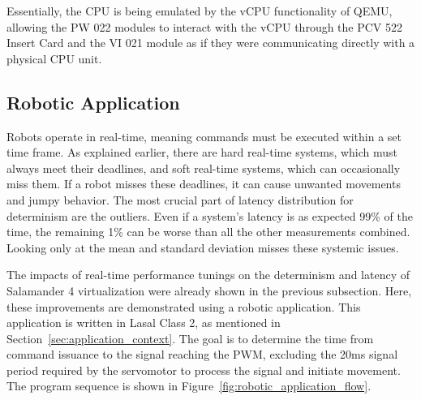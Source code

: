 \documentclass[MMR,Master,english]{style/twbook}
\begin{document}
\noindent Essentially, the CPU is being emulated by the vCPU functionality of QEMU, allowing the PW 022 modules to interact with the vCPU through the PCV 522 Insert Card and the VI 021 module as if they were communicating directly with a physical CPU unit.

\subsection{Robotic Application}

Robots operate in real-time, meaning commands must be executed within a set time frame. As explained earlier, there are hard real-time systems, which must always meet their deadlines, and soft real-time systems, which can occasionally miss them. If a robot misses these deadlines, it can cause unwanted movements and jumpy behavior. The most crucial part of latency distribution for determinism are the outliers. Even if a system's latency is as expected 99\% of the time, the remaining 1\% can be worse than all the other measurements combined. Looking only at the mean and standard deviation misses these systemic issues.

\bigskip \noindent The impacts of real-time performance tunings on the determinism and latency of Salamander 4 virtualization were already shown in the previous subsection. Here, these improvements are demonstrated using a robotic application. This application is written in Lasal Class 2, as mentioned in Section~\ref{sec:application_context}. The goal is to determine the time from command issuance to the signal reaching the PWM, excluding the 20ms signal period required by the servomotor to process the signal and initiate movement. The program sequence is shown in Figure~\ref{fig:robotic_application_flow}.

\vspace{2em}
\end{document}

